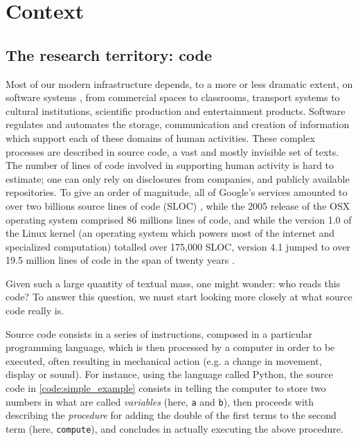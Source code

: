 \section{Context}
\label{sec:context}

\subsection{The research territory: code}
\label{subsec:research-territory}

Most of our modern infrastructure depends, to a more or less dramatic extent, on software systems \citep{kitchin_code_2011}, from commercial spaces to classrooms, transport systems to cultural institutions, scientific production and entertainment products. Software regulates and automates the storage, communication and creation of information which support each of these domains of human activities. These complex processes are described in source code, a vast and mostly invisible set of texts. The number of lines of code involved in supporting human activity is hard to estimate; one can only rely on disclosures from companies, and publicly available repositories. To give an order of magnitude, all of Google's services amounted to over two billions source lines of code (SLOC) \citep{scale_why_2015}, while the 2005 release of the OSX operating system comprised 86 millions lines of code, and while the version 1.0 of the Linux kernel (an operating system which powers most of the internet and specialized computation) totalled over 175,000 SLOC, version 4.1 jumped to over 19.5 million lines of code in the span of twenty years \citep{wikipedia_linux_2021}.

Given such a large quantity of textual mass, one might wonder: who reads this code? To answer this question, we must start looking more closely at what source code really is.

Source code consists in a series of instructions, composed in a particular programming language, which is then processed by a computer in order to be executed, often resulting in mechanical action (e.g. a change in movement, display or sound). For instance, using the language called Python, the source code in \autoref{code:simple_example} consists in telling the computer to store two numbers in what are called \emph{variables} (here, \lstinline{a} and \lstinline{b}), then proceeds with describing the \emph{procedure} for adding the double of the first terms to the second term (here, \lstinline{compute}), and concludes in actually executing the above procedure.

